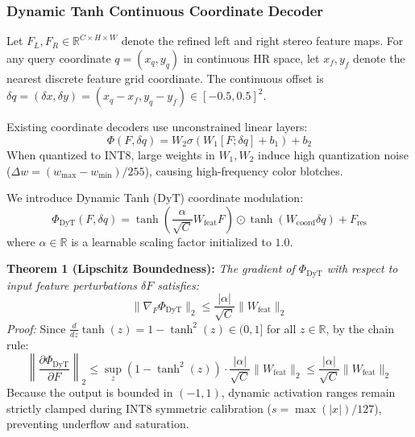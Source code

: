 \documentclass[10pt,journal,compsoc]{IEEEtran}
\begin{document}
\subsubsection{Dynamic Tanh Continuous Coordinate Decoder}
Let $F_L, F_R \in \mathbb{R}^{C \times H \times W}$ denote the refined left and right stereo feature maps. For any query coordinate $q = (x_q, y_q)$ in continuous HR space, let $x_f, y_f$ denote the nearest discrete feature grid coordinate. The continuous offset is $\delta q = (\delta x, \delta y) = (x_q - x_f, y_q - y_f) \in [-0.5, 0.5]^2$.

Existing coordinate decoders use unconstrained linear layers:
\begin{equation}
\Phi(F, \delta q) = W_2 \sigma(W_1 [F; \delta q] + b_1) + b_2
\end{equation}
When quantized to INT8, large weights in $W_1, W_2$ induce high quantization noise ($\Delta w = (w_{\max} - w_{\min})/255$), causing high-frequency color blotches.

We introduce Dynamic Tanh ($\text{DyT}$) coordinate modulation:
\begin{equation}
\Phi_{\text{DyT}}(F, \delta q) = \tanh\left( \frac{\alpha}{\sqrt{C}} W_{\text{feat}} F \right) \odot \tanh\left( W_{\text{coord}} \delta q \right) + F_{\text{res}}
\end{equation}
where $\alpha \in \mathbb{R}$ is a learnable scaling factor initialized to $1.0$.

\noindent \textbf{Theorem 1 (Lipschitz Boundedness):} \textit{The gradient of $\Phi_{\text{DyT}}$ with respect to input feature perturbations $\delta F$ satisfies:}
\begin{equation}
\|\nabla_F \Phi_{\text{DyT}}\|_2 \le \frac{|\alpha|}{\sqrt{C}} \|W_{\text{feat}}\|_2
\end{equation}
\textit{Proof:} Since $\frac{d}{dz} \tanh(z) = 1 - \tanh^2(z) \in (0, 1]$ for all $z \in \mathbb{R}$, by the chain rule:
\begin{equation}
\left\| \frac{\partial \Phi_{\text{DyT}}}{\partial F} \right\|_2 \le \sup_z (1 - \tanh^2(z)) \cdot \frac{|\alpha|}{\sqrt{C}} \|W_{\text{feat}}\|_2 \le \frac{|\alpha|}{\sqrt{C}} \|W_{\text{feat}}\|_2
\end{equation}
Because the output is bounded in $(-1, 1)$, dynamic activation ranges remain strictly clamped during INT8 symmetric calibration ($s = \max(|x|)/127$), preventing underflow and saturation.
\end{document}
